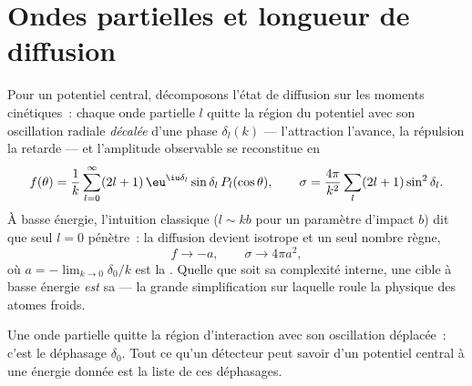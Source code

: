 \section{Ondes partielles et longueur de diffusion}

\begin{theorem}[Déphasages]\label{thm:b3:scattering-theory:partial}
Pour un potentiel central, décomposons l'état de diffusion sur les
moments cinétiques~: chaque onde partielle $l$ quitte la région du
potentiel avec son oscillation radiale \emph{décalée} d'une phase
$\delta_l(k)$ --- l'attraction l'avance, la répulsion la retarde ---
et l'amplitude observable se reconstitue en
\[
f(\theta) = \frac1k\sum_{l=0}^\infty(2l+1)\,\eu^{\iu\delta_l}
\sin\delta_l\,P_l(\cos\theta) , \qquad
\sigma = \frac{4\pi}{k^2}\sum_l(2l+1)\sin^2\delta_l .
\]
À basse énergie, l'intuition classique ($l \sim kb$ pour un paramètre
d'impact $b$) dit que seul $l = 0$ pénètre~: la diffusion devient
isotrope et un seul nombre règne,
\[
f \to -a , \qquad \sigma \to 4\pi a^2 ,
\]
où $a = -\lim_{k\to0}\delta_0/k$ est la \emph{}.
Quelle que soit sa complexité interne, une cible à basse énergie
\emph{est} sa  --- la grande simplification sur
laquelle roule la physique des atomes froids.
\end{theorem}
\admitted

\begin{omfigure}

{\small Une onde partielle quitte la région d'interaction avec son
oscillation déplacée~: c'est le déphasage $\delta_0$. Tout ce qu'un
détecteur peut savoir d'un potentiel central à une énergie donnée est
la liste de ces déphasages.}
\end{omfigure}

